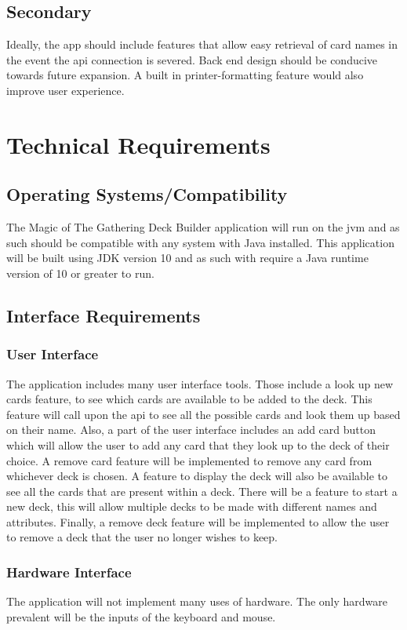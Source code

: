 \documentclass[12pt]{report}
\newcommand{\javaversion}{10 }
\begin{document}
\section{Secondary}
Ideally, the app should include features that allow easy retrieval of card names in the event the \acrshort{api} connection is severed. Back end design should be conducive towards future expansion. A built in printer-formatting feature would also improve user experience. 
\chapter{Technical Requirements}
\section{Operating Systems/Compatibility}
The Magic of The Gathering Deck Builder application will run on the \acrshort{jvm} and as such should be compatible with any system with Java installed. This application will be built using JDK version \javaversion and as such with require a Java runtime version of \javaversion or greater to run.
\section{Interface Requirements}
\subsection{User Interface}
The application includes many user interface tools. Those include a look up new cards feature, to see which cards are available to be added to the deck. This feature will call upon the \acrshort{api} to see all the possible cards and look them up based on their name. Also, a part of the user interface includes an add card button which will allow the user to add any card that they look up to the deck of their choice. A remove card feature will be implemented to remove any card from whichever deck is chosen. A feature to display the deck will also be available to see all the cards that are present within a deck. There will be a feature to start a new deck, this will allow multiple decks to be made with different names and attributes. Finally, a remove deck feature will be implemented to allow the user to remove a deck that the user no longer wishes to keep.
\subsection{Hardware Interface}
The application will not implement many uses of hardware. The only hardware prevalent will be the inputs of the keyboard and mouse.
\end{document}
